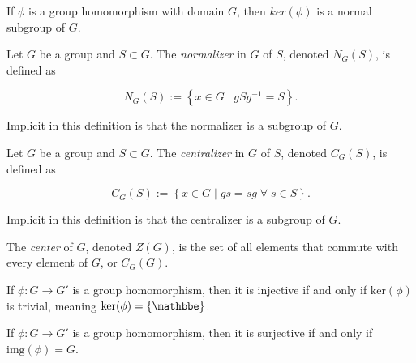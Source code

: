 \begin{theorem}
    \label{theorem : Kernel_normal}
    \leanok
    If $\phi$ is a group homomorphism with domain $G$, then $ker(\phi)$ is a normal subgroup of $G$.
\end{theorem}

\begin{definition}
    \label{definition : Normalizer}
    \leanok
    Let $G$ be a group and $S \subset G$. The \textit{normalizer} in $G$ of $S$, denoted $N_G(S)$, is defined as

    $$N_G(S) := \left\{ x \in G \middle| gSg^{-1} = S \right\}.$$

    Implicit in this definition is that the normalizer is a subgroup of $G$.
\end{definition}

\begin{definition}
    \label{definition : Centralizer}
    \leanok
    Let $G$ be a group and $S \subset G$. The \textit{centralizer} in $G$ of $S$, denoted $C_G(S)$, is defined as

    $$C_G(S) := \left\{ x \in G \middle| gs = sg\;\forall\;s \in S\right\}.$$

    Implicit in this definition is that the centralizer is a subgroup of $G$.
\end{definition}

\begin{definition}
    \label{definition : Center}
    \leanok
    The \textit{center} of $G$, denoted $Z(G)$, is the set of all elements that commute with every element of $G$, or $C_G(G)$.
\end{definition}

\begin{theorem}
    \label{theorem : homomorphism_inj_iff_kernel_trivial}
    \leanok
    If $\phi : G \rightarrow G'$ is a group homomorphism, then it is injective if and only if $\text{ker}(\phi)$ is trivial, meaning $\text{ker}(\phi) = \{\mathbbe\}$.
\end{theorem}

\begin{theorem}
    \label{theorem : homomorphism_surj_iff_image_complete}
    \leanok
    If $\phi : G \rightarrow G'$ is a group homomorphism, then it is surjective if and only if $\text{img}(\phi) = G$.
\end{theorem}
